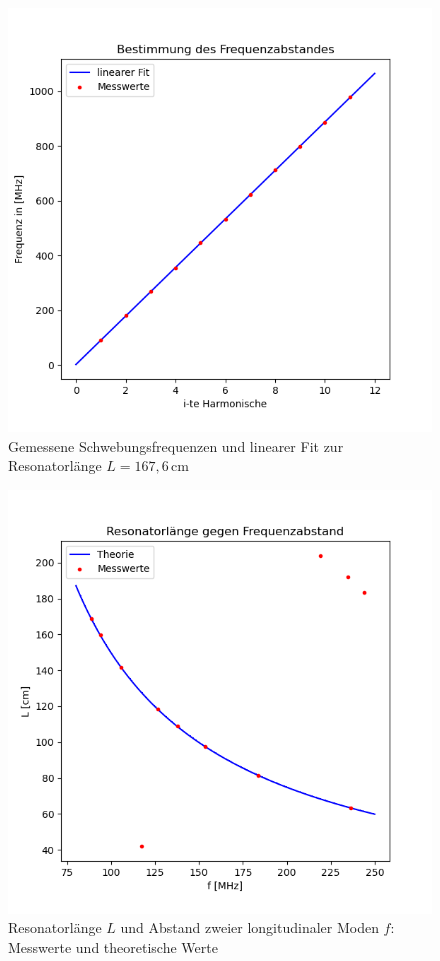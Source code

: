 \begin{figure}
\includegraphics{figures/Frequenzabstand.png}
\caption{Gemessene Schwebungsfrequenzen und linearer Fit zur Resonatorlänge $L = 167,6\,\text{cm}$}
\label{fig:linMultimoden}
\end{figure}



\begin{figure}
\includegraphics{figures/Multimoden.png}
\caption{Resonatorlänge $L$ und Abstand zweier longitudinaler Moden $f$: Messwerte und theoretische Werte}
\label{fig:Multimoden}
\end{figure}




